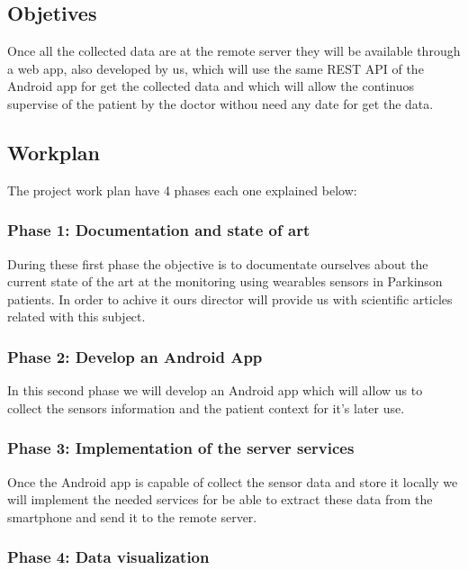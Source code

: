 \subsection{Objetives}

Once all the collected data are at the remote server they will be available through a web app, also developed by us, which will use the same REST API of the Android app for get the collected data and which will allow the continuos supervise of the patient by the doctor withou need any date for get the data.
\newpage

\subsection{Workplan}

The project work plan have 4 phases each one explained below:

\subsubsection{Phase 1: Documentation and state of art}

During these first phase the objective is to documentate ourselves about the current state of the art at the monitoring using wearables sensors in Parkinson patients. In order to achive it ours director will provide us with scientific articles related with this subject.

\subsubsection{Phase 2: Develop an Android App}

In this second phase we will develop an Android app which will allow us to collect the sensors information and the patient context for it's later use.

\subsubsection{Phase 3: Implementation of the server services}

Once the Android app is capable of collect the sensor data and store it locally we will implement the needed services for be able to extract these data from the smartphone and send it to the remote server.

\subsubsection{Phase 4: Data visualization}

